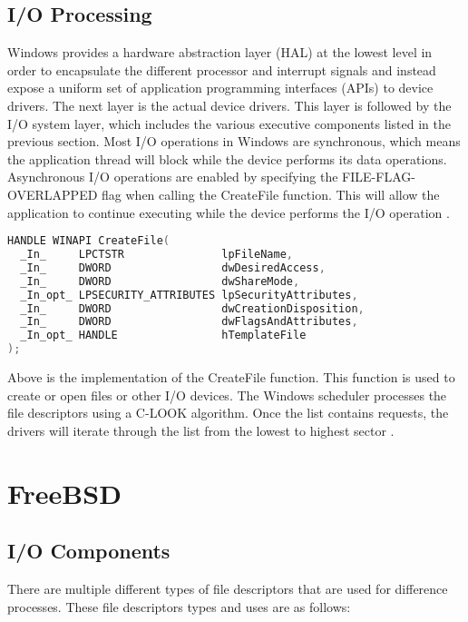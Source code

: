 \documentclass[letterpaper,draftclsnofoot,10pt,onecolumn,titlepage]{IEEEtran}\usepackage[margin=0.75in]{geometry}
\begin{document}
\subsection{I/O Processing}
Windows provides a hardware abstraction layer (HAL) at the lowest level in order to encapsulate the different
processor and interrupt signals and instead expose a uniform set of application programming interfaces (APIs)
to device drivers. The next layer is the actual device drivers. This layer is followed by the I/O system
layer, which includes the various executive components listed in the previous section. Most I/O
operations in Windows are synchronous, which means the application thread will block while the device
performs its data operations. Asynchronous I/O operations are enabled by specifying the FILE-FLAG-OVERLAPPED
flag when calling the CreateFile function. This will allow the application to continue executing while the
device performs the I/O operation \cite{windows}.

\begin{lstlisting}[language=C++]
HANDLE WINAPI CreateFile(
  _In_     LPCTSTR               lpFileName,
  _In_     DWORD                 dwDesiredAccess,
  _In_     DWORD                 dwShareMode,
  _In_opt_ LPSECURITY_ATTRIBUTES lpSecurityAttributes,
  _In_     DWORD                 dwCreationDisposition,
  _In_     DWORD                 dwFlagsAndAttributes,
  _In_opt_ HANDLE                hTemplateFile
); 
\end{lstlisting}

Above is the implementation of the CreateFile function. This function is used to create or open files or
other I/O devices. The Windows scheduler processes the file descriptors using a C-LOOK algorithm. Once
the list contains requests, the drivers will iterate through the list from the lowest to highest sector
\cite{Windows_CreateFile}.

\section{FreeBSD}

\subsection{I/O Components}
There are multiple different types of file descriptors that are used for difference processes. These 
file descriptors types and uses are as follows:
\end{document}
